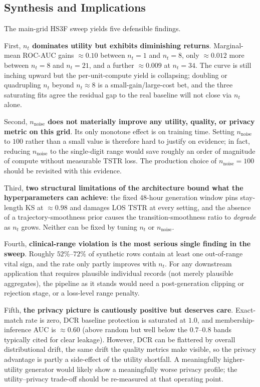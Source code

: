 \subsection{Synthesis and Implications}

The main-grid HS3F sweep yields five defensible findings.

First, \textbf{$n_t$ dominates utility but exhibits diminishing returns}. Marginal-mean ROC-AUC gains $\approx 0.10$ between $n_t{=}1$ and $n_t{=}8$, only $\approx 0.012$ more between $n_t{=}8$ and $n_t{=}21$, and a further $\approx 0.009$ at $n_t{=}34$. The curve is still inching upward but the per-unit-compute yield is collapsing; doubling or quadrupling $n_t$ beyond $n_t{\approx}8$ is a small-gain/large-cost bet, and the three saturating fits agree the residual gap to the real baseline will not close via $n_t$ alone.

Second, \textbf{$n_{\text{noise}}$ does not materially improve any utility, quality, or privacy metric on this grid}. Its only monotone effect is on training time. Setting $n_{\text{noise}}$ to $100$ rather than a small value is therefore hard to justify on evidence; in fact, reducing $n_{\text{noise}}$ to the single-digit range would save roughly an order of magnitude of compute without measurable TSTR loss. The production choice of $n_{\text{noise}}{=}100$ should be revisited with this evidence.

Third, \textbf{two structural limitations of the architecture bound what the hyperparameters can achieve}: the fixed 48-hour generation window pins stay-length KS at $\approx 0.98$ and damages LOS TSTR at every setting, and the absence of a trajectory-smoothness prior causes the transition-smoothness ratio to \emph{degrade} as $n_t$ grows. Neither can be fixed by tuning $n_t$ or $n_{\text{noise}}$.

Fourth, \textbf{clinical-range violation is the most serious single finding in the sweep}. Roughly $52\%$--$72\%$ of synthetic rows contain at least one out-of-range vital sign, and the rate only partly improves with $n_t$. For any downstream application that requires plausible individual records (not merely plausible aggregates), the pipeline as it stands would need a post-generation clipping or rejection stage, or a loss-level range penalty.

Fifth, \textbf{the privacy picture is cautiously positive but deserves care}. Exact-match rate is zero, DCR baseline protection is saturated at $1.0$, and membership-inference AUC is $\approx 0.60$ (above random but well below the $0.7$--$0.8$ bands typically cited for clear leakage). However, DCR can be flattered by overall distributional drift, the same drift the quality metrics make visible, so the privacy advantage is partly a side-effect of the utility shortfall. A meaningfully higher-utility generator would likely show a meaningfully worse privacy profile; the utility--privacy trade-off should be re-measured at that operating point.

